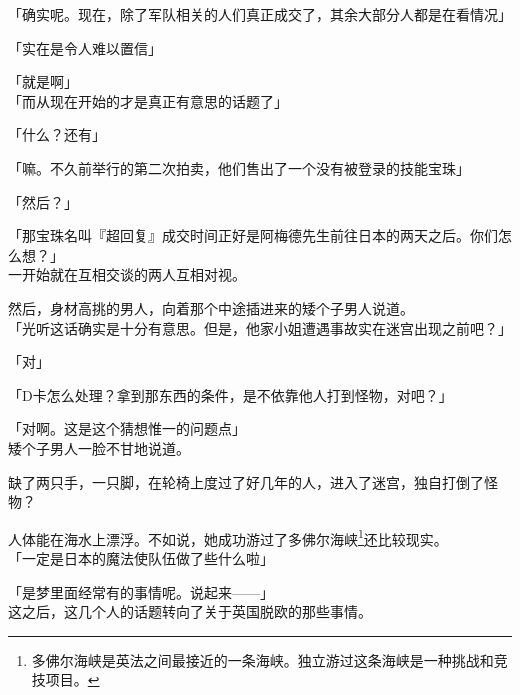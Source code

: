 「确实呢。现在，除了军队相关的人们真正成交了，其余大部分人都是在看情况」

「实在是令人难以置信」

「就是啊」\\

「而从现在开始的才是真正有意思的话题了」

「什么？还有」

「嘛。不久前举行的第二次拍卖，他们售出了一个没有被登录的技能宝珠」

「然后？」

「那宝珠名叫『超回复』成交时间正好是阿梅德先生前往日本的两天之后。你们怎么想？」\\

一开始就在互相交谈的两人互相对视。

然后，身材高挑的男人，向着那个中途插进来的矮个子男人说道。\\

「光听这话确实是十分有意思。但是，他家小姐遭遇事故实在迷宫出现之前吧？」

「对」

「D卡怎么处理？拿到那东西的条件，是不依靠他人打到怪物，对吧？」

「对啊。这是这个猜想惟一的问题点」\\

矮个子男人一脸不甘地说道。

缺了两只手，一只脚，在轮椅上度过了好几年的人，进入了迷宫，独自打倒了怪物？

人体能在海水上漂浮。不如说，她成功游过了多佛尔海峡\footnote{多佛尔海峡是英法之间最接近的一条海峡。独立游过这条海峡是一种挑战和竞技项目。}还比较现实。\\

「一定是日本的魔法使队伍做了些什么啦」

「是梦里面经常有的事情呢。说起来——」\\

这之后，这几个人的话题转向了关于英国脱欧的那些事情。\\

